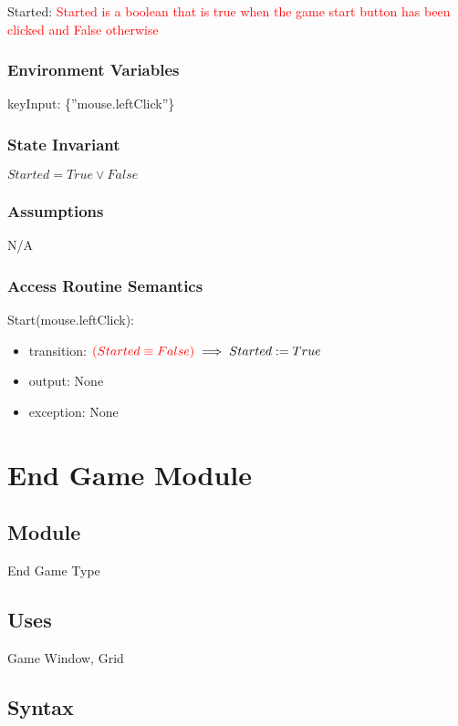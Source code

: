 \documentclass[12pt]{article}
\begin{document}
Started: \textcolor{red}{Started is a boolean that is true when the game start button has been clicked and False otherwise} 


\subsubsection* {Environment Variables}
keyInput: \{”mouse.leftClick”\}

\subsubsection* {State Invariant}

$ Started = True \lor False $

\subsubsection* {Assumptions}

N/A

\subsubsection* {Access Routine Semantics}

\noindent Start(mouse.leftClick):
\begin{itemize}
\item transition: $ \textcolor{red}{(Started \equiv False)} \implies Started := True$
\item output: None
\item exception: None
\end{itemize}

\newpage

\section* {End Game Module}

\subsection*{Module}

End Game Type

\subsection* {Uses}

Game Window, Grid

\subsection* {Syntax}
\end{document}
